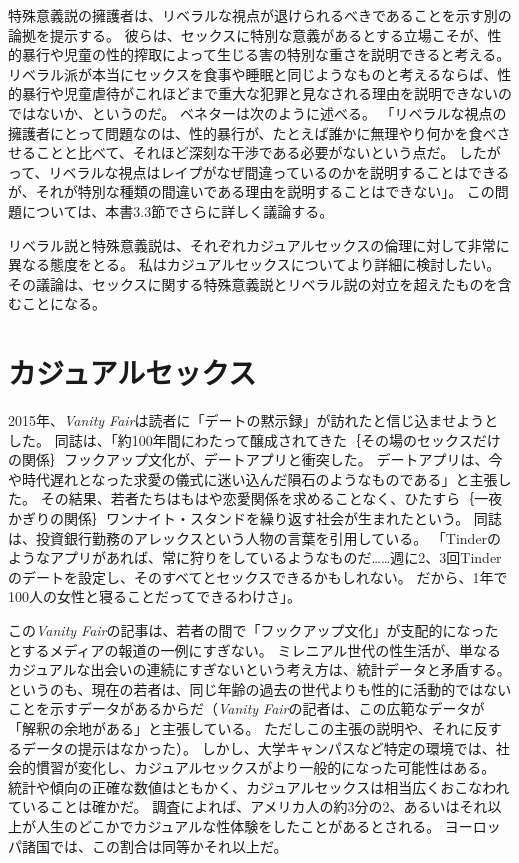 \documentclass[paper=a4,book,openany]{jlreq}
\begin{document}
特殊意義説の擁護者は、リベラルな視点が退けられるべきであることを示す別の論拠を提示する。
彼らは、セックスに特別な意義があるとする立場こそが、性的暴行や児童の性的搾取によって生じる害の特別な重さを説明できると考える。
リベラル派が本当にセックスを食事や睡眠と同じようなものと考えるならば、性的暴行や児童虐待がこれほどまで重大な犯罪と見なされる理由を説明できないのではないか、というのだ。
ベネターは次のように述べる。
「リベラルな視点の擁護者にとって問題なのは、性的暴行が、たとえば誰かに無理やり何かを食べさせることと比べて、それほど深刻な干渉である必要がないという点だ。
したがって、リベラルな視点はレイプがなぜ間違っているのかを説明することはできるが、それが特別な種類の間違いである理由を説明することはできない」\citep{benatar02:_two_views_sexual_ethic}。
この問題については、本書3.3節でさらに詳しく議論する。

リベラル説と特殊意義説は、それぞれカジュアルセックスの倫理に対して非常に異なる態度をとる。
私はカジュアルセックスについてより詳細に検討したい。
その議論は、セックスに関する特殊意義説とリベラル説の対立を超えたものを含むことになる。

\section{カジュアルセックス}

2015年、\emph{Vanity Fair}は読者に「デートの黙示録」が訪れたと信じ込ませようとした。
同誌は、「約100年間にわたって醸成されてきた｛その場のセックスだけの関係｝{フックアップ}文化が、デートアプリと衝突した。
デートアプリは、今や時代遅れとなった求愛の儀式に迷い込んだ隕石のようなものである」と主張した。
その結果、若者たちはもはや恋愛関係を求めることなく、ひたすら｛一夜かぎりの関係｝{ワンナイト・スタンド}を繰り返す社会が生まれたという。
同誌は、投資銀行勤務のアレックスという人物の言葉を引用している。
「Tinderのようなアプリがあれば、常に狩りをしているようなものだ……週に2、3回Tinderのデートを設定し、そのすべてとセックスできるかもしれない。
だから、1年で100人の女性と寝ることだってできるわけさ」\citep{sales15:_tind_dawn_datin_apoc}。

この\emph{Vanity Fair}の記事は、若者の間で「フックアップ文化」が支配的になったとするメディアの報道の一例にすぎない。
ミレニアル世代の性生活が、単なるカジュアルな出会いの連続にすぎないという考え方は、統計データと矛盾する。
というのも、現在の若者は、同じ年齢の過去の世代よりも性的に活動的ではないことを示すデータがあるからだ\citep[cf.][]{twenge17:_declin_sexual_frequen,twenge17:_sexual_inact_durin,monto14:_new_stand_sexual_behav}（\emph{Vanity Fair}の記者は、この広範なデータが「解釈の余地がある」と主張している。
ただしこの主張の説明や、それに反するデータの提示はなかった）。
しかし、大学キャンパスなど特定の環境では、社会的慣習が変化し、カジュアルセックスがより一般的になった可能性はある\citep[cf.][]{bogle08:_hookin}。
統計や傾向の正確な数値はともかく、カジュアルセックスは相当広くおこなわれていることは確かだ。
調査によれば、アメリカ人の約3分の2、あるいはそれ以上が人生のどこかでカジュアルな性体験をしたことがあるとされる。
ヨーロッパ諸国では、この割合は同等かそれ以上だ\citep{met17:_one_nigh_stan,how15:_this_is_how}。
\end{document}
